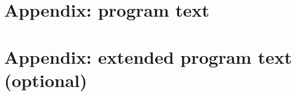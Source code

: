 \documentclass[a4paper]{article}
\begin{document}
\section{Appendix: program text}



\newpage

\section{Appendix: extended program text (optional)}



\newpage


\end{document}
